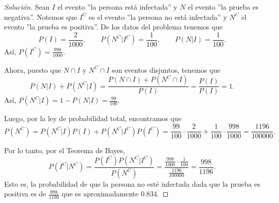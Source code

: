 \documentclass{article}
\renewcommand{\P}[1]{P\left(#1\right)}
\begin{document}
\begin{enumerate}
    \begin{proof}[Soluci\'on]
        Sean $I$ el evento ''la persona est\'a infectada'' y $N$ el evento ''la prueba es negativa''. Notemos que $I^C$ es el evento ''la persona no est\'a infectada'' y $N^C$ el evento ''la prueba es positiva''. De los datos del problema tenemos que
        \[
            \P{I} = \frac{2}{1000}, \qquad \P{N^C | I^C} = \frac{1}{100}, \qquad \P{N | I} = \frac{1}{100}.
        \]
        As\'i, $\P{I^C} = \frac{998}{1000}$.

        Ahora, puesto que $N \cap I$ y $N^C \cap I$ son eventos disjuntos, tenemos que
        \[
            \P{N | I} + \P{N^C | I} = \frac{\P{N \cap I} + \P{N^C \cap I}}{\P{I}} = \frac{\P{I}}{\P{I}} = 1.
        \]
        As\'i, $\P{N^C | I} = 1 - \P{N | I} = \frac{99}{100}$.

        Luego, por la ley de probabilidad total, encontramos que
        \[
            \P{N^C} = \P{N^C | I}\P{I} + \P{N^C | I^C}\P{I^C} = \frac{99}{100}\cdot \frac{2}{1000} + \frac{1}{100}\cdot \frac{998}{1000} = \frac{1196}{100000}.
        \]

        Por lo tanto, por el Teorema de Bayes,
        \[
            \P{I^C | N^C} = \frac{\P{I^C}\P{N^C | I^C}}{\P{N^C}} = \frac{\frac{998}{1000}\cdot \frac{1}{100}}{\frac{1196}{100000}} = \frac{998}{1196}.
        \]
        Esto es, la probabilidad de que la persona no est\'e infectada dada que la prueba es positiva es de $\frac{998}{1196}$ que es aproximadamente 0.834.
        
    \end{proof}

\end{enumerate}
\end{document}
